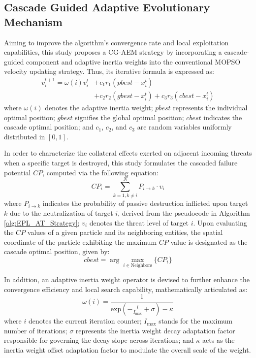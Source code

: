 \documentclass[lettersize,journal]{IEEEtran}
\begin{document}
\subsection{Cascade Guided Adaptive Evolutionary Mechanism}
Aiming to improve the algorithm's convergence rate and local exploitation capabilities, this study proposes a CG-AEM strategy by incorporating a cascade-guided component and adaptive inertia weights into the conventional MOPSO velocity updating strategy. Thus, its iterative formula is expressed as:
\begin{equation}
    \begin{aligned}
        v_{i}^{t+1} = \omega(i) v_{i}^t &+ c_1r_1(pbest-x_i^t) \\
        &+ c_2r_2(gbest-x_i^t) + c_3r_3(cbest-x_i^t)
    \end{aligned}
    \label{eq:tradition_MOPSO_calculation}
\end{equation}
where $\omega(i)$ denotes the adaptive inertia weight; $pbest$ represents the individual optimal position; $gbest$ signifies the global optimal position; $cbest$ indicates the cascade optimal position; and $c_1$, $c_2$, and $c_3$ are random variables uniformly distributed in $[0,1]$.

In order to characterize the collateral effects exerted on adjacent incoming threats when a specific target is destroyed, this study formulates the cascaded failure potential $CP$, computed via the following equation:
\begin{equation}
    CP_i=\sum_{k=1,k\neq i}^NP_{i\to k}\cdot v_i
    \label{eq:Cascaded potential vector}
\end{equation}
where $P_{i\to k}$ indicates the probability of passive destruction inflicted upon target $k$ due to the neutralization of target $i$, derived from the pseudocode in Algorithm \ref{alg:EPL_AT_Strategy}; $v_i$ denotes the threat level of target $i$. Upon evaluating the $CP$ values of a given particle and its neighboring entities, the spatial coordinate of the particle exhibiting the maximum $CP$ value is designated as the cascade optimal position, given by:
\begin{equation}
    cbest=\arg\max_{i\in\text{Neighbors}}\{CP_i\}
    \label{eq:cbest_calculation}
\end{equation}

In addition, an adaptive inertia weight operator is devised to further enhance the convergence efficiency and local search capability, mathematically articulated as:
\begin{equation}
    \omega(i)=\frac{1}{\text{exp}(-\frac{i}{I_{\text{max}}}+\sigma)-\kappa}
    \label{eq:Improved Adaptive Inertia Weights}
\end{equation}
where $i$ denotes the current iteration counter; $I_{\text{max}}$ stands for the maximum number of iterations; $\sigma$ represents the inertia weight decay adaptation factor responsible for governing the decay slope across iterations; and $\kappa$ acts as the inertia weight offset adaptation factor to modulate the overall scale of the weight.
\end{document}

